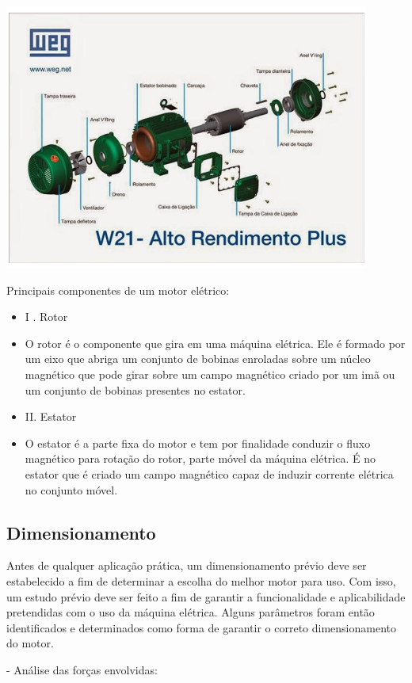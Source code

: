                         \begin{center}
    	\includegraphics[scale=0.7]{figuras/rotor}
        \label{rotor}
    \end{center}


Principais componentes de um motor elétrico: 
     \begin{itemize}
    \item 
     I . Rotor
         \item 
 O rotor é o componente que gira em uma máquina elétrica. Ele é formado por um eixo que abriga um conjunto de bobinas enroladas sobre um núcleo magnético que pode girar sobre um campo magnético criado por um imã ou um conjunto de bobinas presentes no estator.
 \item 

  II. Estator 
 \item 
O estator é a parte fixa do motor e tem por finalidade conduzir o fluxo magnético para rotação do rotor, parte móvel da máquina elétrica. É no estator que é criado um campo magnético capaz de induzir corrente elétrica no conjunto móvel.

    \end{itemize}

     
\subsection{Dimensionamento}

Antes de qualquer aplicação prática, um dimensionamento prévio deve ser estabelecido a fim de determinar a escolha do melhor motor para uso. Com isso, um estudo prévio deve ser feito a fim de garantir a funcionalidade e aplicabilidade pretendidas com o uso da máquina elétrica. Alguns parâmetros foram então identificados e determinados como forma de garantir o correto dimensionamento do motor. 
 \item 
- Análise das forças envolvidas: 
 \item 
                                  
